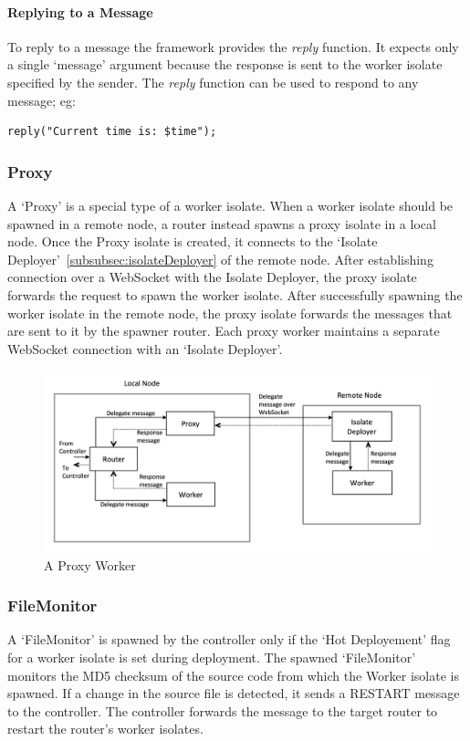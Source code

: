   \paragraph{Replying to a Message}
  \label{subsec:replyMessage}

  To reply to a message the framework provides the \emph{reply} function. It expects only a single ‘message’ argument because the response is sent to the worker isolate specified by the sender. The \emph{reply} function can be used to respond to any message; eg:
\begin{lstlisting}[numbers=none]
  reply("Current time is: $time");
\end{lstlisting}

  \subsubsection{Proxy}
  A ‘Proxy’ is a special type of a worker isolate. When a worker isolate should be spawned in a remote node, a router instead spawns a proxy isolate in a local node. Once the Proxy isolate is created, it connects to the ‘Isolate Deployer’~\autoref{subsubsec:isolateDeployer} of the remote node. After establishing connection over a WebSocket with the Isolate Deployer, the proxy isolate forwards the request to spawn the worker isolate. After successfully spawning the worker isolate in the remote node, the proxy isolate forwards the messages that are sent to it by the spawner router. Each proxy worker maintains a separate WebSocket connection with an ‘Isolate Deployer’.\\

  \begin{figure}[H]
    \centering
    \includegraphics[width=1\textwidth]{figures/proxy}
    \caption[Proxy Worker]{A Proxy Worker}
    \label{fig:proxy}
  \end{figure}

  \subsubsection{FileMonitor}
  \label{subsubsec:fileMonitor}
  A ‘FileMonitor’ is spawned by the controller only if the ‘Hot Deployement’ flag for a worker isolate is set during deployment. The spawned ‘FileMonitor’ monitors the MD5 checksum of the source code from which the Worker isolate is spawned. If a change in the source file is detected, it sends a RESTART message to the controller. The controller forwards the message to the target router to restart the router's worker isolates.

